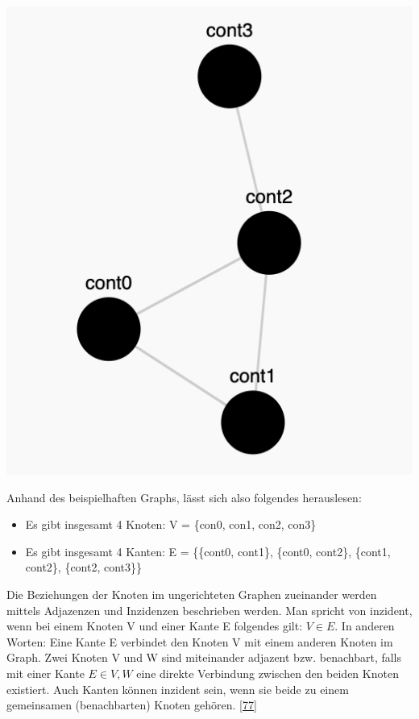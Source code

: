 \documentclass[
    headings=optiontotocandhead,%
    twoside,
    numbers=noenddot,%
    12pt, %
    titlepage, %
    parskip=full, %
    listof=leveldown, 
    numbers=noenddot, %
    a4paper,DIV=14,
    BCOR=15mm,
]{scrbook}
\let\origfigure=\figure
\let\endorigfigure=\endfigure
\renewenvironment{figure}[1][]{%
   \origfigure[H]
}{%
   \endorigfigure
}
\providecommand{\tightlist}{%
  \setlength{\itemsep}{0pt}\setlength{\parskip}{0pt}}
\begin{document}
\begin{figure}
\centering
\includegraphics{img/Gekle/GraphExample.png}
\caption{Beispiel eines ungerichteten Graphen}
\end{figure}

Anhand des beispielhaften Graphs, lässt sich also folgendes herauslesen:

\begin{itemize}
\tightlist
\item
  Es gibt insgesamt 4 Knoten: V = \{con0, con1, con2, con3\}
\item
  Es gibt insgesamt 4 Kanten: E = \{\{cont0, cont1\}, \{cont0, cont2\},
  \{cont1, cont2\}, \{cont2, cont3\}\}
\end{itemize}

Die Beziehungen der Knoten im ungerichteten Graphen zueinander werden
mittels Adjazenzen und Inzidenzen beschrieben werden. Man spricht von
inzident, wenn bei einem Knoten V und einer Kante E folgendes gilt:
\(V \in E\). In anderen Worten: Eine Kante E verbindet den Knoten V mit
einem anderen Knoten im Graph. Zwei Knoten V und W sind miteinander
adjazent bzw. benachbart, falls mit einer Kante \(E \in {V, W}\) eine
direkte Verbindung zwischen den beiden Knoten existiert. Auch Kanten
können inzident sein, wenn sie beide zu einem gemeinsamen (benachbarten)
Knoten gehören.
{[}\protect\hyperlink{ref-Uni-Bremen-Graphentheorie}{77}{]}
\end{document}
